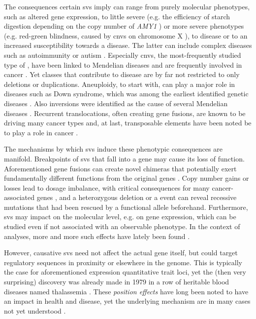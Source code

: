 The consequences certain \acp{sv} imply can range from purely molecular
phenotypes, such as altered gene expression, to little severe (e.g. the efficiency of
starch digestion depending on the copy number of \textit{AMY1} \citep{Perry2007})
or more severe phenotypes (e.g. red-green blindness, caused by \acp{cnv} on
chromosome X \citep{Nathans1986}), to disease or to an increased susceptibility
towards a disease. The latter can include complex diseases such as autoimmunity
\citep{Fanciulli2007} or autism \citep{Sebat2007}. Especially \acp{cnv}, the
most-frequently studied type of \sv, have been linked to Mendelian diseases
\citep[see table 2]{Zhang2009} and are frequently involved in cancer
\citep{Beroukhim2010}. Yet \sv classes that contribute to disease are by far
not restricted to only deletions or duplications. Aneuploidy, to start with, can
play a major role in diseases such as Down syndrome, which was among the earliest
identified genetic diseases \citep{Lejeune1959}. Also inversions were identified
as the cause of several Mendelian diseases \citep{Feuk2010}. Recurrent
translocations, often creating gene fusions, are known to be driving many
cancer types \citep{Mertens2015} and, at last, transposable elements have
been noted be to play a role in cancer \citep{Burns2017}.

The mechanisms by which \acp{sv} induce these phenotypic consequences are
manifold. Breakpoints of \acp{sv} that fall into a gene may cause its loss
of function. Aforementioned gene fusions can create novel chimeras that
potentially exert fundamentally different functions from the original genes
\citep{Mertens2015}. Copy number gains or losses lead to dosage imbalance, with
critical consequences for many cancer-associated genes \citep{Fehrmann2015}, and
a heterozygous deletion or a \loh event can reveal recessive mutations
that had been rescued by a functional allele beforehand.
Furthermore, \acp{sv} may impact on the molecular level, e.g. on gene expression,
which can be studied even if not associated with an observable phenotype.
In the context of  analyses,
more and more such effects have lately been found \citep{Sudmant2015,Chiang2017}.

However, causative \acp{sv} need not affect the actual gene itself, but could
target regulatory sequences in proximity or elsewhere in the genome. This is
typically the case for aforementioned expression quantitative trait loci, yet
the (then very surprising) discovery was already made in 1979 in a row of
heritable blood diseases named thalassemia \citep{Fritsch1979}. These
\emph{position effects} have long been noted to have an impact in health and
disease, yet the underlying mechanism are in many cases not yet understood
\citep{Kleinjan2005}.

